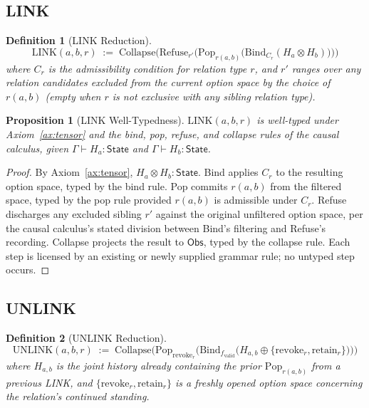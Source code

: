 \documentclass[11pt]{article}
\newtheorem{definition}{Definition}[section]
\newtheorem{proposition}{Proposition}[section]
\begin{document}
\subsection{LINK}

\begin{definition}[LINK Reduction]
\label{def:link-reduction}
\[
\mathrm{LINK}(a,b,r) \;:=\;
\mathrm{Collapse}\Big(
\mathrm{Refuse}_{r'}\big(
\mathrm{Pop}_{r(a,b)}\big(
\mathrm{Bind}_{C_r}(H_a \otimes H_b)
\big)
\big)
\Big)
\]
where $C_r$ is the admissibility condition for relation type $r$, and $r'$ ranges over any relation candidates excluded from the current option space by the choice of $r(a,b)$ (empty when $r$ is not exclusive with any sibling relation type).
\end{definition}

\begin{proposition}[LINK Well-Typedness]
\label{prop:link-typed}
$\mathrm{LINK}(a,b,r)$ is well-typed under Axiom~\ref{ax:tensor} and the bind, pop, refuse, and collapse rules of the causal calculus, given $\Gamma \vdash H_a : \mathsf{State}$ and $\Gamma \vdash H_b : \mathsf{State}$.
\end{proposition}
\begin{proof}
By Axiom~\ref{ax:tensor}, $H_a \otimes H_b : \mathsf{State}$. Bind applies $C_r$ to the resulting option space, typed by the bind rule. Pop commits $r(a,b)$ from the filtered space, typed by the pop rule provided $r(a,b)$ is admissible under $C_r$. Refuse discharges any excluded sibling $r'$ against the original unfiltered option space, per the causal calculus's stated division between Bind's filtering and Refuse's recording. Collapse projects the result to $\mathsf{Obs}$, typed by the collapse rule. Each step is licensed by an existing or newly supplied grammar rule; no untyped step occurs.
\end{proof}

\subsection{UNLINK}

\begin{definition}[UNLINK Reduction]
\label{def:unlink-reduction}
\[
\mathrm{UNLINK}(a,b,r) \;:=\;
\mathrm{Collapse}\Big(
\mathrm{Pop}_{\mathrm{revoke}_r}\big(
\mathrm{Bind}_{f_{\mathrm{valid}}}\big(
H_{a,b} \oplus \{\mathrm{revoke}_r, \mathrm{retain}_r\}
\big)
\big)
\Big)
\]
where $H_{a,b}$ is the joint history already containing the prior $\mathrm{Pop}_{r(a,b)}$ from a previous LINK, and $\{\mathrm{revoke}_r, \mathrm{retain}_r\}$ is a freshly opened option space concerning the relation's continued standing.
\end{definition}
\end{document}
